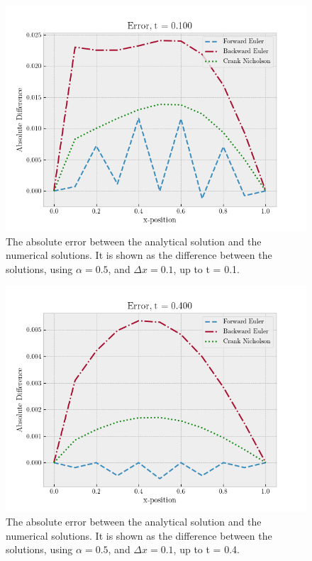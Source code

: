 \documentclass[%
reprint,
nofootinbib,
amsmath,amssymb,
aps,
]{revtex4-1}
\newcommand{\dx}{{\Delta x}}
\begin{document}
\begin{figure}
	\centering
	\includegraphics[width=0.95\linewidth]{./figures/error0101.png}
	\caption{The absolute error between the analytical solution and the numerical solutions. It is shown as the difference between the solutions, using $\alpha = 0.5$, and $\dx = 0.1$, up to t = 0.1.}
	\label{fig error0101}
\end{figure}
\begin{figure}
	\centering
	\includegraphics[width=0.95\linewidth]{./figures/error0401.png}
	\caption{The absolute error between the analytical solution and the numerical solutions. It is shown as the difference between the solutions, using $\alpha = 0.5$, and $\dx = 0.1$, up to t = 0.4.}
	\label{fig error0401}
\end{figure}
\end{document}
